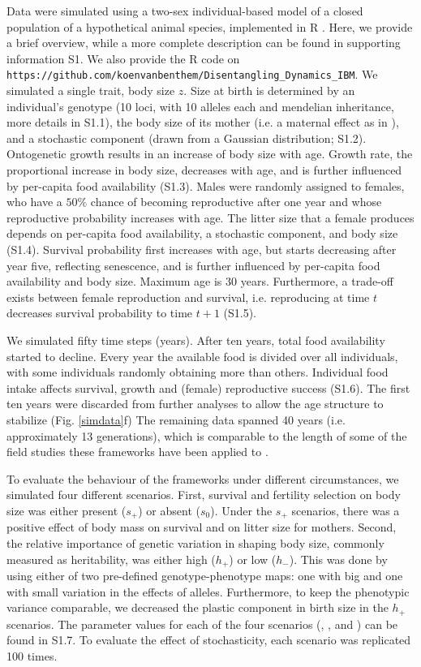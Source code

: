 Data were simulated using a two-sex individual-based model of a closed population of a hypothetical animal species, implemented in R \parencite{R2014}. Here, we provide a brief overview, while a more complete description can be found in supporting information S1. We also provide the R code on \newline \verb|https://github.com/koenvanbenthem/Disentangling_Dynamics_IBM|. We simulated a single trait, body size $z$. Size at birth is determined by an individual's genotype (10 loci, with 10 alleles each and mendelian inheritance, more details in S1.1), the body size of its mother (i.e. a maternal effect as in \cite{Falconer1965}), and a stochastic component (drawn from a Gaussian distribution; S1.2). Ontogenetic growth results in an increase of body size with age. Growth rate, the proportional increase in body size,  decreases with age, and is further influenced by per-capita food availability (S1.3). Males were randomly assigned to females, who have a $50\%$ chance of becoming reproductive after one year and whose reproductive probability increases with age. The litter size that a female produces depends on per-capita food availability, a stochastic component, and body size (S1.4). Survival probability first increases with age, but starts decreasing after year five, reflecting senescence, and is further influenced by per-capita food availability and body size. Maximum age is 30 years. Furthermore, a trade-off exists between female reproduction and survival, i.e. reproducing at time $t$ decreases survival probability to time $t+1$ (S1.5). 

We simulated fifty time steps (years). After ten years, total food availability started to decline. Every year the available food is divided over all individuals, with some individuals randomly obtaining more than others. Individual food intake affects survival, growth and (female) reproductive success (S1.6). The first ten years were discarded from further analyses to allow the age structure to stabilize (Fig. \ref{simdata}f) The remaining data spanned 40 years (i.e. approximately 13 generations), which is comparable to the length of some of the field studies these frameworks have been applied to \parencite{Clutton-brock2010}. 

To evaluate the behaviour of the frameworks under different circumstances, we simulated four different scenarios. First, survival and fertility selection on body size was either present ($s_+$) or absent ($s_0$). Under the $s_+$ scenarios, there was a positive effect of body mass on survival and on litter size for mothers. Second, the relative importance of genetic variation in shaping body size, commonly measured as heritability, was either high ($h_+$) or low ($h_-$). This was done by using either of two pre-defined genotype-phenotype maps: one with big and one with small variation in the effects of alleles. Furthermore, to keep the phenotypic variance comparable, we decreased the plastic component in birth size in the $h_+$ scenarios. The parameter values for each of the four scenarios (\sh, \sH, \Sh and \SH) can be found in S1.7. To evaluate the effect of stochasticity, each scenario was replicated 100 times.


